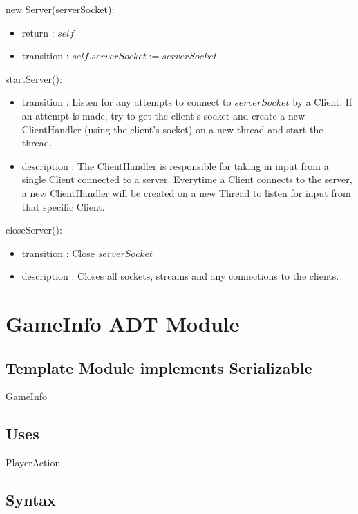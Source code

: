 \documentclass[12pt, titlepage]{article}
\begin{document}
        \noindent new Server(serverSocket):
        \begin{itemize}
        \item return : $self$
        \item transition : $self.serverSocket := serverSocket$
        \end{itemize}
        
        \noindent startServer():
        \begin{itemize}
        \item transition : Listen for any attempts to connect to $serverSocket$ by a Client. If an attempt is made, try to get the client's socket and create a new ClientHandler (using the client's socket) on a new thread and start the thread.
        \item description : The ClientHandler is responsible for taking in input from a single Client connected to a server. Everytime a Client connects to the server, a new ClientHandler will be created on a new Thread to listen for input from that specific Client. 
        \end{itemize}
        
        \noindent closeServer():
        \begin{itemize}
        \item transition : Close $serverSocket$
        \item description : Closes all sockets,  streams and any connections to the clients.
        \end{itemize}
        
                
                        
        
\section* {GameInfo ADT Module}
    \subsection* {Template Module implements Serializable}
    GameInfo
    \subsection* {Uses}
    PlayerAction
    \subsection* {Syntax}
    
\end{document}
